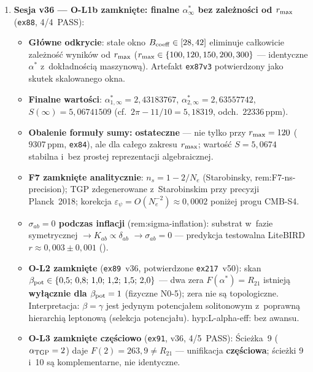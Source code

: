 \begin{remark}
\begin{enumerate}[nosep]
  \item \textbf{Sesja v36 --- O-L1b zamkni\k{e}te:
    finalne $\alpha^*_\infty$ bez zale\.zno\'sci od $r_{\rm max}$}
    (\texttt{ex88}, 4/4~PASS):
    \begin{itemize}[nosep]
      \item \textbf{G\l{}\'owne odkrycie}: stałe okno $B_{\rm coeff}\in[28,42]$
        eliminuje ca\l{}kowicie zale\.zno\'s\'c wynik\'ow od $r_{\rm max}$
        ($r_{\rm max} \in \{100,120,150,200,300\}$ --- identyczne $\alpha^*$
        z~dok\l{}adno\'sci\k{a} maszynow\k{a}).
        Artefakt \texttt{ex87v3} potwierdzony jako skutek skalowanego okna.
      \item \textbf{Finalne warto\'sci}:
        $\alpha^*_{1,\infty} = 2{,}43183767$,
        $\alpha^*_{2,\infty} = 2{,}63557742$,
        $S(\infty) = 5{,}06741509$ (cf.\ $2\pi - 11/10 = 5{,}18319$,
        odch.\ $22336\,\text{ppm}$).
      \item \textbf{Obalenie formu\l{}y sumy:} \textbf{ostateczne} ---
        nie tylko przy $r_{\rm max}=120$ ($9307\,\text{ppm}$, \texttt{ex84}),
        ale dla ca\l{}ego zakresu $r_{\rm max}$; warto\'s\'c $S=5{,}0674$
        stabilna i~bez prostej reprezentacji algebraicznej.
      \item \textbf{F7 zamkni\k{e}te analitycznie}:
        $n_s = 1 - 2/N_e$ (Starobinsky, rem:F7-ns-precision);
        TGP zdegenerowane z~Starobinskim przy precyzji Planck~2018;
        korekcja $\varepsilon_\psi = O(N_e^{-2}) \approx 0{,}0002$ poni\.zej
        progu CMB-S4.
      \item \textbf{$\sigma_{ab}=0$ podczas inflacji} (rem:sigma-inflation):
        substrat w~fazie symetrycznej $\to K_{ab}\propto\delta_{ab}$
        $\to \sigma_{ab}=0$ --- predykcja testowalna LiteBIRD
        $r\approx 0{,}003\pm 0{,}001$ ().
      \item \textbf{O-L2 zamkni\k{e}te} (\texttt{ex89}~v36,
        potwierdzone \texttt{ex217}~v50):
        skan $\beta_{\rm pot}\in\{0{,}5;\,0{,}8;\,1{,}0;\,1{,}2;\,1{,}5;\,2{,}0\}$
        --- dwa zera $F(\alpha^*)=R_{21}$ istniej\k{a}
        \textbf{wy\l{}\k{a}cznie dla $\beta_{\rm pot}=1$}
        (fizyczne N0-5); zera nie s\k{a} topologiczne.
        Interpretacja: $\beta=\gamma$ jest jedynym potencja\l{}em
        solitonowym z~poprawn\k{a} hierarchi\k{a} leptonow\k{a}
        (selekcja potencja\l{}u).
        hyp:L-alpha-eff: bez awansu.
      \item \textbf{O-L3 zamkni\k{e}te cz\k{e}\'sciowo} (\texttt{ex91}, v36,
        4/5~PASS): \'Scie\.zka~9 ($\alpha_{\rm TGP}=2$) daje
        $F(2)=263{,}9\neq R_{21}$ --- unifikacja \textbf{cz\k{e}\'sciowa};
        \'scie\.zki 9 i~10 s\k{a} komplementarne, nie identyczne.
    \end{itemize}


\end{enumerate}
\end{remark}
